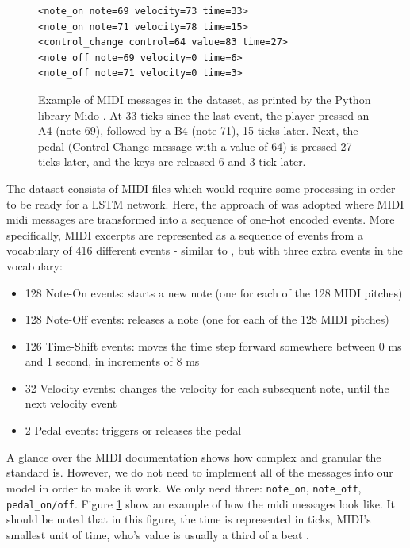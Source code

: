 \documentclass[a4paper]{book}
\begin{document}
\begin{figure}[t]
    \centering
    \begin{verbatim}
<note_on note=69 velocity=73 time=33>
<note_on note=71 velocity=78 time=15>
<control_change control=64 value=83 time=27>
<note_off note=69 velocity=0 time=6>
<note_off note=71 velocity=0 time=3>
    \end{verbatim}
    \caption{Example of MIDI messages in the dataset, as printed by the Python library Mido \parencite{bjorndalen_mido_2018}. At 33 ticks since the last event, the player pressed an A4 (note 69), followed by a B4 (note 71), 15 ticks later. Next, the pedal (Control Change message with a value of 64) is pressed 27 ticks later, and the keys are released 6 and 3 tick later.}
    \label{fig:midi_examples}
\end{figure}

The dataset consists of MIDI files which would require some processing in order to be ready for a LSTM network. Here, the approach of \textcite{oore_this_2018} was adopted where MIDI midi messages are transformed into a sequence of one-hot encoded events. More specifically, MIDI excerpts are represented as a sequence of events from a vocabulary of 416 different events - similar to \textcite{oore_this_2018}, but with three extra events in the vocabulary:
\begin{itemize}
    \item 128 Note-On events: starts a new note (one for each of the 128 MIDI pitches)
    \item 128 Note-Off events: releases a note (one for each of the 128 MIDI pitches)
    \item 126 Time-Shift events: moves the time step forward somewhere between 0 ms and 1 second, in increments of 8 ms
    \item 32 Velocity events: changes the velocity for each subsequent note, until the next velocity event
    \item 2 Pedal events: triggers or releases the pedal
\end{itemize}

A glance over the MIDI documentation \parencite{midi_association_official_2019} shows how complex and granular the standard is. However, we do not need to implement all of the messages into our model in order to make it work. We only need three: \texttt{note\_on}, \texttt{note\_off}, \texttt{pedal\_on/off}. Figure \ref{fig:midi_examples} show an example of how the midi messages look like. It should be noted that in this figure, the time is represented in ticks, MIDI's smallest unit of time, who's value is usually a third of a beat \parencite{midi_association_official_2019}.
\end{document}
